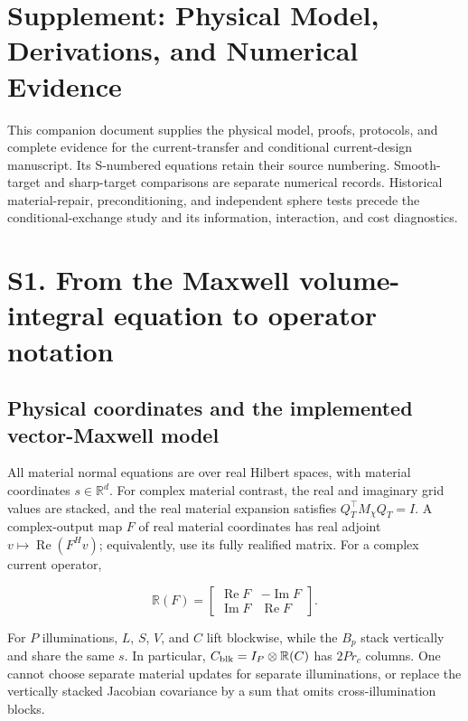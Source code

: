 \documentclass[11pt]{article}
\begin{document}
\section*{Supplement: Physical Model, Derivations, and Numerical Evidence}
This companion document supplies the physical model, proofs, protocols, and complete evidence for the current-transfer and conditional current-design manuscript. Its S-numbered equations retain their source numbering. Smooth-target and sharp-target comparisons are separate numerical records. Historical material-repair, preconditioning, and independent sphere tests precede the conditional-exchange study and its information, interaction, and cost diagnostics.
\setcounter{figure}{0}
\renewcommand{\thefigure}{S\arabic{figure}}
\renewcommand{\theHfigure}{S\arabic{figure}}
\setcounter{table}{0}
\renewcommand{\thetable}{S\arabic{table}}
\renewcommand{\theHtable}{S\arabic{table}}
\section*{S1. From the Maxwell volume-integral equation to operator notation}

\subsection*{Physical coordinates and the implemented vector-Maxwell model}

All material normal equations are over real Hilbert spaces, with material coordinates \(s\in\mathbb R^d\). For complex material contrast, the real and imaginary grid values are stacked, and the real material expansion satisfies \(Q_T^\top M_\chi Q_T=I\). A complex-output map \(F\) of real material coordinates has real adjoint \(v\mapsto\operatorname{Re}(F^Hv)\); equivalently, use its fully realified matrix. For a complex current operator,

\[
\mathbb R(F)=\begin{bmatrix}\operatorname{Re}F&-\operatorname{Im}F\\
\operatorname{Im}F&\operatorname{Re}F\end{bmatrix}.
\]

For \(P\) illuminations, \(L\), \(S\), \(V\), and \(C\) lift blockwise, while the \(B_p\) stack vertically and share the same \(s\). In particular, \(C_{\rm blk}=I_P\otimes\mathbb R(C)\) has \(2Pr_c\) columns. One cannot choose separate material updates for separate illuminations, or replace the vertically stacked Jacobian covariance by a sum that omits cross-illumination blocks.
\end{document}
